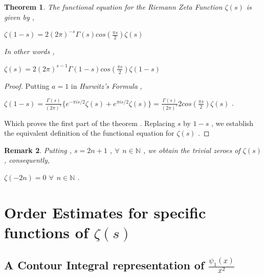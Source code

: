 \documentclass[article,12pt]{elsarticle}
\newtheorem{thm}{Theorem}[section]
\newtheorem{rmk}[thm]{Remark}
\begin{document}
	\begin{thm}
		The functional equation for the Riemann Zeta Function $\zeta(s)$ is given by ,
		\begin{center}
			$\zeta(1-s)=2{(2\pi)}^{-s}\Gamma(s)cos(\frac{\pi s}{2})\zeta(s)$
		\end{center}
		In other words ,
		\begin{center}
			$\zeta(s)=2{(2\pi)}^{s-1}\Gamma(1-s)cos(\frac{\pi s}{2})\zeta(1-s)$
		\end{center}
	\end{thm}
	\begin{proof}
		Putting $a=1$ in \textit{Hurwitz's Formula} , 
		\begin{center}
			$\zeta(1-s)=\frac{\Gamma(s)}{{(2\pi)}^{s}}\{{e}^{-\pi is/2}\zeta(s)+{e}^{\pi is/2}\zeta(s)\}=\frac{\Gamma(s)}{{(2\pi)}^{s}}2cos(\frac{\pi s}{2})\zeta(s)$ .
		\end{center}
		Which proves the first part of the theorem . Replacing $s$ by $1-s$ , we establish the equivalent definition of the functional equation for $\zeta(s)$ .
	\end{proof}
	\begin{rmk}
		Putting , $s=2n+1$ ,\hspace{10pt} $\forall\hspace{5pt} n\in \mathbb{N}$ ,  we obtain the \textit{trivial zeroes} of $\zeta(s)$ , consequently,
		\begin{center}
			$\zeta(-2n)=0$ \hspace{20pt}   $\forall\hspace{5pt} n\in \mathbb{N}$ .
		\end{center}
	\end{rmk}
	
	\section{Order Estimates for specific functions of $\zeta(s)$}
	\subsection{A Contour Integral representation of $\frac{\psi_{1}(x)}{x^{2}}$}
	
\end{document}

